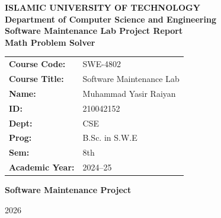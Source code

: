 \documentclass[12pt,a4paper,openany]{report}
\begin{document}

\begin{titlepage}
    \centering

    \vspace*{1.0cm}

    {\Large \textbf{ISLAMIC UNIVERSITY OF TECHNOLOGY}}\\[0.4cm]
    {\large \textbf{Department of Computer Science and Engineering}}\\[1.5cm]

    {\Huge \textbf{Software Maintenance Lab Project Report}}\\[1.0cm]

    {\LARGE \textbf{Math Problem Solver}}\\[1.8cm]

    \renewcommand{\arraystretch}{1.5}

    \begin{tabular}{ll}
        \textbf{Course Code:} & SWE-4802 \\
        \textbf{Course Title:} & Software Maintenance Lab \\
        \textbf{Name:} & Muhammad Yasir Raiyan \\
        \textbf{ID:} & 210042152 \\
        \textbf{Dept:} & CSE \\
        \textbf{Prog:} & B.Sc. in S.W.E \\
        \textbf{Sem:} & 8th \\
        \textbf{Academic Year:} & 2024--25 \\
    \end{tabular}

    \vfill

    {\large \textbf{Software Maintenance Project}}

    \vspace{0.5cm}

    {\large 2026}

\end{titlepage}



\tableofcontents

\end{document}
